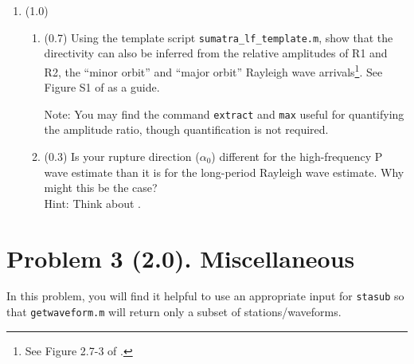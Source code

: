 \documentclass[11pt,titlepage,fleqn]{article}
\begin{document}
\begin{enumerate}

\item (1.0)
%
\begin{enumerate}
\item (0.7) Using the template script \verb+sumatra_lf_template.m+, show that the directivity can also be inferred from the relative amplitudes of R1 and R2, the ``minor orbit'' and ``major orbit'' Rayleigh wave arrivals\footnote{See Figure 2.7-3 of \citet{SteinWysession}.}. See Figure S1 of \citet{Ammon2005} as a guide.

Note: You may find the command \verb+extract+ and \verb+max+ useful for quantifying the amplitude ratio, though quantification is not required.

\item (0.3) Is your rupture direction ($\alpha_0$) different for the high-frequency P wave estimate than it is for the long-period Rayleigh wave estimate. Why might this be the case? \\
Hint: Think about .
\end{enumerate}

\end{enumerate}


\section*{Problem 3 (2.0). Miscellaneous}

In this problem, you will find it helpful to use an appropriate input for \verb+stasub+ so that \verb+getwaveform.m+ will return only a subset of stations/waveforms.
\end{document}
